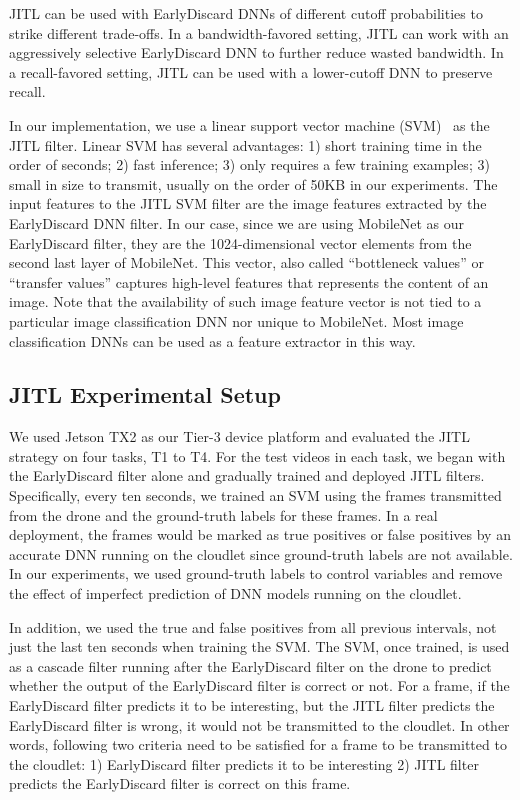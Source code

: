 JITL can be used with EarlyDiscard DNNs of different cutoff probabilities to
strike different trade-offs. In a bandwidth-favored setting, JITL can work with
an aggressively selective EarlyDiscard DNN to further reduce wasted bandwidth. In
a recall-favored setting, JITL can be used with a lower-cutoff DNN to preserve
recall.

In our implementation, we use a linear support vector machine
(SVM)~\cite{Friedman2001} as the JITL filter. Linear SVM has several advantages:
1) short training time in the order of seconds; 2) fast inference; 3) only
requires a few training examples; 3) small in size to transmit, usually on the
order of 50KB in our experiments. The input features to the JITL SVM filter are
the image features extracted by the EarlyDiscard DNN filter. In our case, since
we are using MobileNet as our EarlyDiscard filter, they are the 1024-dimensional
vector elements from the second last layer of MobileNet. This vector, also
called ``bottleneck values'' or ``transfer values'' captures high-level features
that represents the content of an image. Note that the availability of such
image feature vector is not tied to a particular image classification DNN nor
unique to MobileNet. Most image classification DNNs can be used as a feature
extractor in this way.

\subsection{JITL Experimental Setup}
We used Jetson TX2 as our Tier-3 device platform and evaluated the JITL strategy
on four tasks, T1 to T4. For the test videos in each task, we began with the
EarlyDiscard filter alone and gradually trained and deployed JITL filters.
Specifically, every ten seconds, we trained an SVM using the frames transmitted
from the drone and the ground-truth labels for these frames. In a real
deployment, the frames would be marked as true positives or false positives by
an accurate DNN running on the cloudlet since ground-truth labels are not
available. In our experiments, we used ground-truth labels to control variables
and remove the effect of imperfect prediction of DNN models running on the
cloudlet. 

In addition, we used the true and false positives from all previous intervals,
not just the last ten seconds when training the SVM. The SVM, once trained, is
used as a cascade filter running after the EarlyDiscard filter on the drone to
predict whether the output of the EarlyDiscard filter is correct or not. For a
frame, if the EarlyDiscard filter predicts it to be interesting, but the JITL
filter predicts the EarlyDiscard filter is wrong, it would not be transmitted to
the cloudlet. In other words, following two criteria need to be satisfied for a
frame to be transmitted to the cloudlet: 1) EarlyDiscard filter predicts it to
be interesting 2) JITL filter predicts the EarlyDiscard filter is correct on
this frame.

